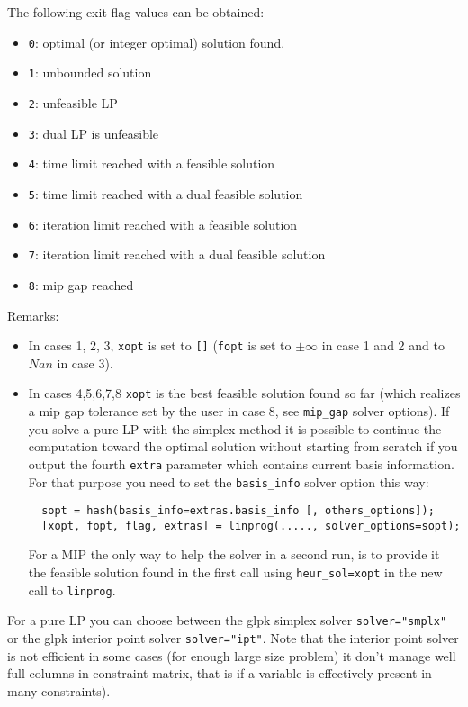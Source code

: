 \begin{mandescription}
The following exit flag values can be obtained:
\begin{itemize}
\item \verb+0+: optimal (or integer optimal) solution found.
\item \verb+1+: unbounded solution
\item \verb+2+: unfeasible LP
\item \verb+3+: dual LP is unfeasible
\item \verb+4+: time limit reached with a feasible solution
\item \verb+5+: time limit reached with a dual feasible solution
\item \verb+6+: iteration limit reached with a feasible solution
\item \verb+7+: iteration limit reached with a dual feasible solution
\item \verb+8+: mip gap reached
\end{itemize}

Remarks:
\begin{itemize}
\item In cases 1, 2, 3, \verb+xopt+ is set to \verb+[]+ (\verb+fopt+ is set to
$\pm \infty$ in case 1 and 2 and to $Nan$ in case 3). 

\item In cases 4,5,6,7,8 \verb+xopt+ is the best feasible solution found so far 
(which realizes a mip gap tolerance set by the user in case 8, 
see \verb+mip_gap+ solver options). If you solve a pure LP with the simplex
method it is possible to continue the computation toward the optimal
solution without starting from scratch if you output the fourth \verb+extra+
parameter which contains current basis information. For that purpose you
need to set the \verb+basis_info+ solver option this way:
\begin{Verbatim}
  sopt = hash(basis_info=extras.basis_info [, others_options]);
  [xopt, fopt, flag, extras] = linprog(....., solver_options=sopt);
\end{Verbatim}
For a MIP the only way to help the solver in a second run, is to provide 
it the feasible solution found in the first call using \verb+heur_sol=xopt+ 
in the new call to \verb+linprog+.
\end{itemize}

For a pure LP you can choose between the glpk simplex solver 
{\tt solver="smplx"} or the glpk interior point solver 
{\tt solver="ipt"}. Note that the interior point solver is
not efficient in some cases (for enough large size problem) 
it don't manage well full columns in constraint matrix, that is if a variable
is effectively present in many constraints).


\end{mandescription}
